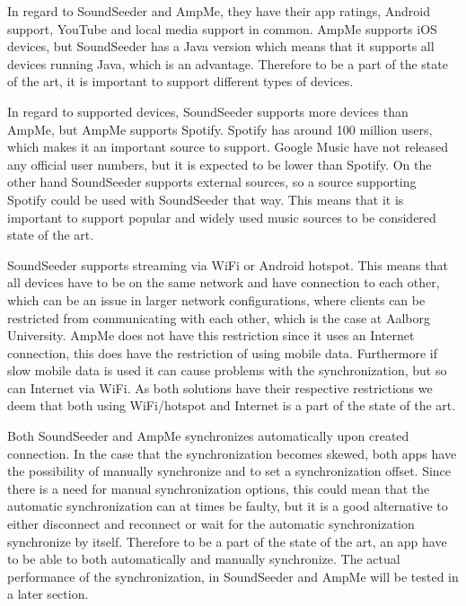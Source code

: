 In regard to SoundSeeder and AmpMe, they have their app ratings, Android support, YouTube and local media support in common.
AmpMe supports iOS devices, but SoundSeeder has a Java version which means that it supports all devices running Java, which is an advantage. 
Therefore to be a part of the state of the art, it is important to support different types of devices.

In regard to supported devices, SoundSeeder supports more devices than AmpMe, but AmpMe supports Spotify.
Spotify has around 100 million users, which makes it an important source to support\cite{spotify_subscribers}.
Google Music have not released any official user numbers, but it is expected to be lower than Spotify\cite{googlem_subscribers}.
On the other hand SoundSeeder supports external sources, so a source supporting Spotify could be used with SoundSeeder that way.
This means that it is important to support popular and widely used music sources to be considered state of the art.

SoundSeeder supports streaming via WiFi or Android hotspot. 
This means that all devices have to be on the same network and have connection to each other,
which can be an issue in larger network configurations, where clients can be restricted from communicating with each other,
which is the case at Aalborg University.
AmpMe does not have this restriction since it uses an Internet connection, this does have the restriction of using mobile data.
Furthermore if slow mobile data is used it can cause problems with the synchronization, but so can Internet via WiFi. 
As both solutions have their respective restrictions we deem that both using WiFi/hotspot and Internet is a part of the state of the art.

Both SoundSeeder and AmpMe synchronizes automatically upon created connection.
In the case that the synchronization becomes skewed, both apps have the possibility of manually synchronize and to set a synchronization offset.
Since there is a need for manual synchronization options, this could mean that the automatic synchronization can at times be faulty,
but it is a good alternative to either disconnect and reconnect or wait for the automatic synchronization synchronize by itself.
Therefore to be a part of the state of the art, an app have to be able to both automatically and manually synchronize.
The actual performance of the synchronization, in SoundSeeder and AmpMe will be tested in a later section.


